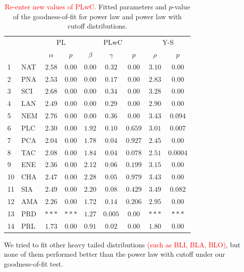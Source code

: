 \documentclass[aps,prl,floatfix,twocolumn]{revtex4-1}
\begin{document}
\begin{table}
 \begin{tabular}{l|l||c|c||c|c|c||c|c}
  && \multicolumn{2}{c||}{PL} & \multicolumn{3}{c||}{PLwC} & \multicolumn{2}{c}{Y-S} \\
  && $\alpha$ & $p$ & $\beta$ & $\gamma$ & $p$ & $\rho$ & $p$ \\
  \hline
  \hline 1 & NAT & $2.58$ & $0.00$ & $0.00$ & $0.32$ & $0.00$ & $3.10$ & $0.00$  \\
  \hline 2 & PNA & $2.53$ & $0.00$ & $0.00$ & $0.17$ & $0.00$ & $2.83$ & $0.00$  \\
  \hline 3 & SCI & $2.68$ & $0.00$ & $0.00$ & $0.34$ & $0.00$ & $3.28$ & $0.00$  \\
  \hline 4 & LAN & $2.49$ & $0.00$ & $0.00$ & $0.29$ & $0.00$ & $2.90$ & $0.00$  \\
  \hline 5 & NEM & $2.76$ & $0.00$ & $0.00$ & $0.36$ & $0.00$ & $3.43$ & $0.094$ \\
  \hline 6 & PLC & $2.30$ & $0.00$ & $1.92$ & $0.10$ & $0.659$ & $3.01$ & $0.007$ \\
  \hline 7 & PCA & $2.04$ & $0.00$ & $1.78$ & $0.04$ & $0.927$ & $2.45$ & $0.00$  \\
  \hline 8 & TAC & $2.08$ & $0.00$ & $1.84$ & $0.04$ & $0.078$ & $2.51$ & $0.0004$ \\
  \hline 9 & ENE & $2.36$ & $0.00$ & $2.12$ & $0.06$ & $0.199$ & $3.15$ & $0.00$  \\
  \hline 10 & CHA & $2.47$ & $0.00$ & $2.28$ & $0.05$ & $0.979$ & $3.43$ & $0.00$  \\
  \hline 11 & SIA & $2.49$ & $0.00$ & $2.20$ & $0.08$ & $0.429$ & $3.49$ & $0.082$ \\
  \hline 12 & AMA & $2.26$ & $0.00$ & $1.72$ & $0.14$ & $0.206$ & $2.95$ & $0.00$  \\
  \hline 13 & PRD & $***$ & $***$ & $1.27$ & $0.005$ & $0.00$ & $***$ & $***$ \\
  \hline 14 & PRL & $1.73$ & $0.00$ & $0.91$ & $0.02$ & $0.00$ & $1.80$ & $0.00$  
 \end{tabular}
 \caption{\textcolor{red}{Re-enter new values of PLwC.} Fitted parameters and $p$-value of the goodness-of-fit for power law and power law with cutoff distributions.}
 \label{tab:fit_gof}
\end{table}

We tried to fit other heavy tailed distributions \textcolor{red}{(such as BLI, BLA, BLO)}, but none of them performed better than the power law with cutoff under our goodness-of-fit test. 
\end{document}
